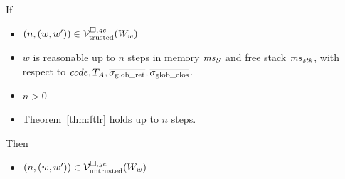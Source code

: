 \documentclass[a4paper]{article}
\begin{document}
\begin{lemma}
  \label{lem:trusted-and-reasonable-is-untrusted}
  If
  \begin{itemize}
  \item $\left(n,(w,w')\right) \in \mathcal{V}^{\square,\mathit{gc}}_{\mathrm{trusted}}(W_w)$
  \item $w$ is reasonable up to $n$ steps in memory $\mathit{ms}_S$ and free stack $\mathit{ms}_{\mathit{stk}}$, with respect to $\mathit{code},T_{A},\overline{\sigma_{\mathrm{glob\_ret}}},\overline{\sigma_{\mathrm{glob\_clos}}}$.
  \item $n > 0$
  \item Theorem~\ref{thm:ftlr} holds up to $n$ steps.
  \end{itemize}
  Then
  \begin{itemize}
  \item $\left(n,(w,w')\right) \in \mathcal{V}^{\square,\mathit{gc}}_{\mathrm{untrusted}}(W_w)$
  \end{itemize}
\end{lemma}
\end{document}
